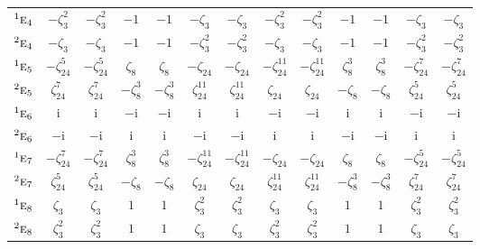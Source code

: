 \documentclass[10pt,a4paper]{article}
\numberwithin{equation}{section}
\newcommand{\irr}[1]{\text{\normalfont\scshape #1}}
\newcommand{\conjpair}[1]{{}^{#1}}
\newcommand{\iunit}{\mathrm{i}}
\newcommand{\rootunity}[1]{\zeta_{#1}}
\begin{document}
{\begin{longtable}{@{}lcccccccccccc@{}}
$\conjpair{1}\irr{e}_{4}$ & $-\rootunity{3}^{2}$ & $-\rootunity{3}^{2}$ & $-1$ & $-1$ & $-\rootunity{3}$ & $-\rootunity{3}$ & $-\rootunity{3}^{2}$ & $-\rootunity{3}^{2}$ & $-1$ & $-1$ & $-\rootunity{3}$ & $-\rootunity{3}$\\
$\conjpair{2}\irr{e}_{4}$ & $-\rootunity{3}$ & $-\rootunity{3}$ & $-1$ & $-1$ & $-\rootunity{3}^{2}$ & $-\rootunity{3}^{2}$ & $-\rootunity{3}$ & $-\rootunity{3}$ & $-1$ & $-1$ & $-\rootunity{3}^{2}$ & $-\rootunity{3}^{2}$\\
$\conjpair{1}\irr{e}_{5}$ & $-\rootunity{24}^{5}$ & $-\rootunity{24}^{5}$ & $\rootunity{8}$ & $\rootunity{8}$ & $-\rootunity{24}$ & $-\rootunity{24}$ & $-\rootunity{24}^{11}$ & $-\rootunity{24}^{11}$ & $\rootunity{8}^{3}$ & $\rootunity{8}^{3}$ & $-\rootunity{24}^{7}$ & $-\rootunity{24}^{7}$\\
$\conjpair{2}\irr{e}_{5}$ & $\rootunity{24}^{7}$ & $\rootunity{24}^{7}$ & $-\rootunity{8}^{3}$ & $-\rootunity{8}^{3}$ & $\rootunity{24}^{11}$ & $\rootunity{24}^{11}$ & $\rootunity{24}$ & $\rootunity{24}$ & $-\rootunity{8}$ & $-\rootunity{8}$ & $\rootunity{24}^{5}$ & $\rootunity{24}^{5}$\\
$\conjpair{1}\irr{e}_{6}$ & $\iunit{}$ & $\iunit{}$ & $-\iunit{}$ & $-\iunit{}$ & $\iunit{}$ & $\iunit{}$ & $-\iunit{}$ & $-\iunit{}$ & $\iunit{}$ & $\iunit{}$ & $-\iunit{}$ & $-\iunit{}$\\
$\conjpair{2}\irr{e}_{6}$ & $-\iunit{}$ & $-\iunit{}$ & $\iunit{}$ & $\iunit{}$ & $-\iunit{}$ & $-\iunit{}$ & $\iunit{}$ & $\iunit{}$ & $-\iunit{}$ & $-\iunit{}$ & $\iunit{}$ & $\iunit{}$\\
$\conjpair{1}\irr{e}_{7}$ & $-\rootunity{24}^{7}$ & $-\rootunity{24}^{7}$ & $\rootunity{8}^{3}$ & $\rootunity{8}^{3}$ & $-\rootunity{24}^{11}$ & $-\rootunity{24}^{11}$ & $-\rootunity{24}$ & $-\rootunity{24}$ & $\rootunity{8}$ & $\rootunity{8}$ & $-\rootunity{24}^{5}$ & $-\rootunity{24}^{5}$\\
$\conjpair{2}\irr{e}_{7}$ & $\rootunity{24}^{5}$ & $\rootunity{24}^{5}$ & $-\rootunity{8}$ & $-\rootunity{8}$ & $\rootunity{24}$ & $\rootunity{24}$ & $\rootunity{24}^{11}$ & $\rootunity{24}^{11}$ & $-\rootunity{8}^{3}$ & $-\rootunity{8}^{3}$ & $\rootunity{24}^{7}$ & $\rootunity{24}^{7}$\\
$\conjpair{1}\irr{e}_{8}$ & $\rootunity{3}$ & $\rootunity{3}$ & $1$ & $1$ & $\rootunity{3}^{2}$ & $\rootunity{3}^{2}$ & $\rootunity{3}$ & $\rootunity{3}$ & $1$ & $1$ & $\rootunity{3}^{2}$ & $\rootunity{3}^{2}$\\
$\conjpair{2}\irr{e}_{8}$ & $\rootunity{3}^{2}$ & $\rootunity{3}^{2}$ & $1$ & $1$ & $\rootunity{3}$ & $\rootunity{3}$ & $\rootunity{3}^{2}$ & $\rootunity{3}^{2}$ & $1$ & $1$ & $\rootunity{3}$ & $\rootunity{3}$\\

\end{longtable}}
\end{document}
